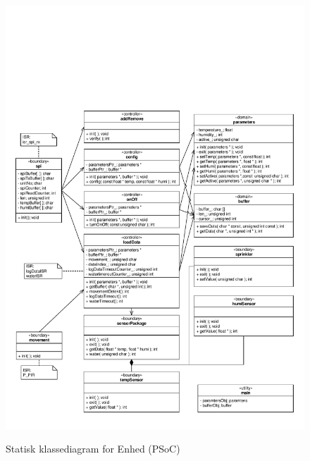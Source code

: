 
\begin{figure}[!htbp] \centering
{\includegraphics[scale=0.7]{filer/design/sw_class_psoc_static}}
\caption{Statisk klassediagram for Enhed (PSoC)}
\label{fig:class_psoc_static_dev}
\end{figure}

